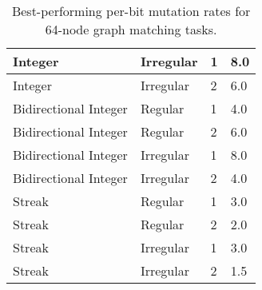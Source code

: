 \begin{table}[!htbp]
\begin{tabular}{l|l|l|l}
Integer               & Irregular                 & 1                      & 8.0                                                                                          \\\hline
Integer               & Irregular                 & 2                      & 6.0                                                                                          \\\hline
Bidirectional Integer & Regular                   & 1                      & 4.0                                                                                          \\\hline
Bidirectional Integer & Regular                   & 2                      & 6.0                                                                                          \\\hline
Bidirectional Integer & Irregular                 & 1                      & 8.0                                                                                          \\\hline
Bidirectional Integer & Irregular                 & 2                      & 4.0                                                                                          \\\hline
Streak                & Regular                   & 1                      & 3.0                                                                                          \\\hline
Streak                & Regular                   & 2                      & 2.0                                                                                          \\\hline
Streak                & Irregular                 & 1                      & 3.0                                                                                          \\\hline
Streak                & Irregular                 & 2                      & 1.5                                                                             \end{tabular}

\caption{
Best-performing per-bit mutation rates for 64-node graph matching tasks.
}
\label{tab:evo_graph_mut_big}


\end{table}
